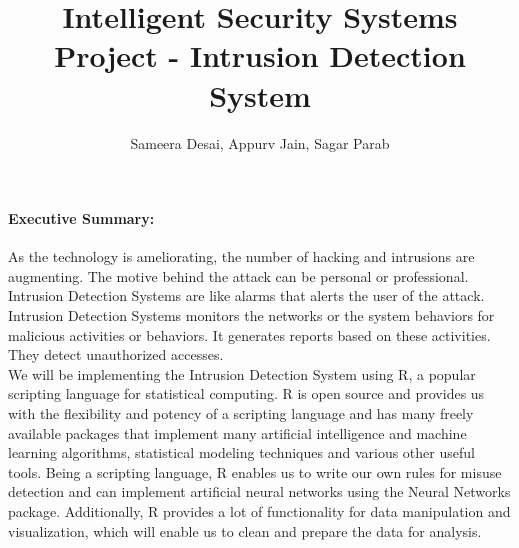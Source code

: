 \documentclass{report}
\title{Intelligent Security Systems\\Project - Intrusion Detection System}
\author{Sameera Desai, Appurv Jain, Sagar Parab}
\begin{document}
\maketitle
\paragraph{Executive Summary:\\}
As the technology is ameliorating, the number of hacking and intrusions are augmenting. The motive behind the attack can be personal or professional. Intrusion Detection Systems are like alarms that alerts the user of the attack. Intrusion Detection Systems monitors the networks or the system behaviors for malicious activities or behaviors. It generates reports based on these activities. They detect unauthorized accesses.\\

We will be implementing the Intrusion Detection System using R, a popular scripting language for statistical computing. R is open source and provides us with the flexibility and potency of a scripting language and has many freely available packages that implement many artificial intelligence and machine learning algorithms, statistical modeling techniques and various other useful tools. Being a scripting language, R enables us to write our own rules for misuse detection and can implement artificial neural networks using the Neural Networks package. Additionally, R provides a lot of functionality for data manipulation and visualization, which will enable us to clean and prepare the data for analysis.



	
\end{document}
